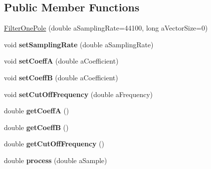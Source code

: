 \subsection*{Public Member Functions}
\begin{DoxyCompactItemize}
\item 
\hyperlink{class_filter_one_pole_aa420e43a875791fa5332aaa3d5654f5a}{Filter\-One\-Pole} (double a\-Sampling\-Rate=44100, long a\-Vector\-Size=0)
\item 
\hypertarget{class_filter_one_pole_a118ec1e24997eb8603f34f30f8fd06a5}{void {\bfseries set\-Sampling\-Rate} (double a\-Sampling\-Rate)}\label{class_filter_one_pole_a118ec1e24997eb8603f34f30f8fd06a5}

\item 
\hypertarget{class_filter_one_pole_ab44016c3073687e627d9196c07ddb494}{void {\bfseries set\-Coeff\-A} (double a\-Coefficient)}\label{class_filter_one_pole_ab44016c3073687e627d9196c07ddb494}

\item 
\hypertarget{class_filter_one_pole_a0ae3f86d4d9d2ce37fa020e6f15942f6}{void {\bfseries set\-Coeff\-B} (double a\-Coefficient)}\label{class_filter_one_pole_a0ae3f86d4d9d2ce37fa020e6f15942f6}

\item 
\hypertarget{class_filter_one_pole_a322259144e6df23695578991234a4561}{void {\bfseries set\-Cut\-Off\-Frequency} (double a\-Frequency)}\label{class_filter_one_pole_a322259144e6df23695578991234a4561}

\item 
\hypertarget{class_filter_one_pole_a5edb88ff5424eb6cadf16be1316770b1}{double {\bfseries get\-Coeff\-A} ()}\label{class_filter_one_pole_a5edb88ff5424eb6cadf16be1316770b1}

\item 
\hypertarget{class_filter_one_pole_ab746acf7c5a865d3145856aa0edb8ff1}{double {\bfseries get\-Coeff\-B} ()}\label{class_filter_one_pole_ab746acf7c5a865d3145856aa0edb8ff1}

\item 
\hypertarget{class_filter_one_pole_a8e3e803096cb900f7f822f9b8359b447}{double {\bfseries get\-Cut\-Off\-Frequency} ()}\label{class_filter_one_pole_a8e3e803096cb900f7f822f9b8359b447}

\item 
\hypertarget{class_filter_one_pole_a1f137013e13ccb09916c1a300af8c043}{double {\bfseries process} (double a\-Sample)}\label{class_filter_one_pole_a1f137013e13ccb09916c1a300af8c043}


\end{DoxyCompactItemize}

